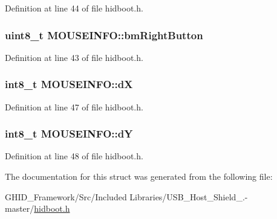 \-Definition at line 44 of file hidboot.\-h.

\hypertarget{struct_m_o_u_s_e_i_n_f_o_a07f604e1dffc0a72fa28e94a5094ebbe}{
\subsubsection[{bm\-Right\-Button}]{\setlength{\rightskip}{0pt plus 5cm}uint8\-\_\-t {\bf \-M\-O\-U\-S\-E\-I\-N\-F\-O\-::bm\-Right\-Button}}}\label{struct_m_o_u_s_e_i_n_f_o_a07f604e1dffc0a72fa28e94a5094ebbe}


\-Definition at line 43 of file hidboot.\-h.

\hypertarget{struct_m_o_u_s_e_i_n_f_o_a8b67db1c54e5db9782a0b5b707dcf9db}{
\subsubsection[{d\-X}]{\setlength{\rightskip}{0pt plus 5cm}int8\-\_\-t {\bf \-M\-O\-U\-S\-E\-I\-N\-F\-O\-::d\-X}}}\label{struct_m_o_u_s_e_i_n_f_o_a8b67db1c54e5db9782a0b5b707dcf9db}


\-Definition at line 47 of file hidboot.\-h.

\hypertarget{struct_m_o_u_s_e_i_n_f_o_ae7192500776548f5c6868cc37eaaabb2}{
\subsubsection[{d\-Y}]{\setlength{\rightskip}{0pt plus 5cm}int8\-\_\-t {\bf \-M\-O\-U\-S\-E\-I\-N\-F\-O\-::d\-Y}}}\label{struct_m_o_u_s_e_i_n_f_o_ae7192500776548f5c6868cc37eaaabb2}


\-Definition at line 48 of file hidboot.\-h.



\-The documentation for this struct was generated from the following file\-:\begin{DoxyCompactItemize}
\item 
\-G\-H\-I\-D\-\_\-\-Framework/\-Src/\-Included Libraries/\-U\-S\-B\-\_\-\-Host\-\_\-\-Shield\-\_.-\/master/\hyperlink{hidboot_8h}{hidboot.\-h}\end{DoxyCompactItemize}
